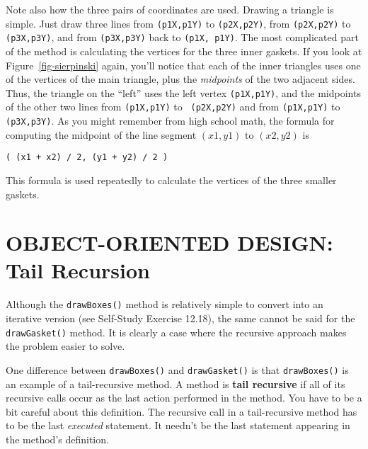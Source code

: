 Note also how the three pairs of coordinates are used.  Drawing a
triangle is simple.  Just draw three lines from {\tt (p1X,p1Y)} to
{\tt (p2X,p2Y)}, from {\tt (p2X,p2Y)} to {\tt (p3X,p3Y)}, and from
{\tt (p3X,p3Y)} back to {\tt (p1X, p1Y)}. The most complicated part of
the method is calculating the vertices for the three inner gaskets.
If you look at Figure~\ref{fig-sierpinski} again, you'll notice that
each of the inner triangles uses one of the vertices of the main
triangle, plus the {\it midpoints} of the two adjacent sides.  Thus,
the triangle on the ``left'' uses the left vertex {\tt (p1X,p1Y)}, and
the midpoints of the other two lines from {\tt (p1X,p1Y)} to {\tt
(p2X,p2Y)} and from {\tt (p1X,p1Y)} to {\tt (p3X,p3Y)}.  As you might
remember from high school math, the formula for computing the midpoint
of the line segment $(x1,y1)$ to $(x2,y2)$ is

\begin{jjjlisting}
\begin{lstlisting}
( (x1 + x2) / 2, (y1 + y2) / 2 )
\end{lstlisting}
\end{jjjlisting}

\noindent This formula is used repeatedly to calculate the
vertices of the three smaller gaskets.


\section{OBJECT-ORIENTED DESIGN:\\ Tail Recursion}
\label{objectorienteddesign-tail-recursion}
\noindent Although the {\tt drawBoxes()} method is relatively simple to convert
into an iterative version (see Self-Study Exercise 12.18), the same cannot be said for the
{\tt drawGasket()} method.  It is clearly a case where the recursive
approach makes the problem easier to solve.

One difference between {\tt drawBoxes()} and {\tt drawGasket()} is
that {\tt drawBoxes()} is an example of a tail-recursive method.   A
method is {\bf tail recursive} 
if all of its recursive calls occur as
the last action performed in the method.  You have to be a bit careful
about this definition.  The recursive call in a tail-recursive method
has to be the last {\it executed} statement.  It needn't be the last
statement appearing in the method's definition.

